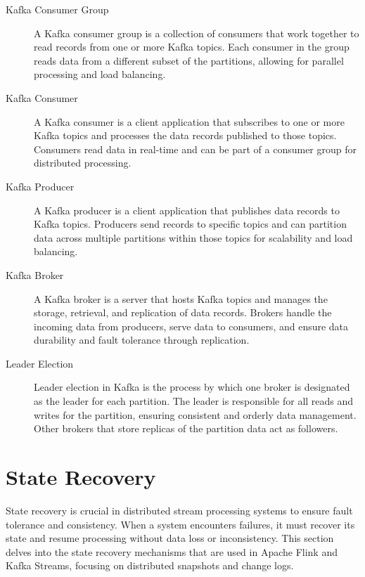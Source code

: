 \begin{description}
    \item[Kafka Consumer Group] A Kafka consumer group is a collection of consumers that work together to
    read records from one or more Kafka topics.
    Each consumer in the group reads data from a different subset of the partitions,
    allowing for parallel processing and load balancing.
    \item[Kafka Consumer] A Kafka consumer is a client application that subscribes to one
    or more Kafka topics and processes the data records published to those topics.
    Consumers read data in real-time and can be part of a
    consumer group for distributed processing.
    \item[Kafka Producer] A Kafka producer is a client application that publishes
    data records to Kafka topics. Producers send records to specific topics and can partition
    data across multiple partitions within those topics for scalability and load balancing.
    \item[Kafka Broker] A Kafka broker is a server that hosts Kafka topics and manages
    the storage, retrieval, and replication of data records.
    Brokers handle the incoming data from producers, serve data to consumers, and ensure data durability and fault tolerance through replication.
    \item[Leader Election] Leader election in Kafka is the process by
    which one broker is designated as the leader for each partition.
    The leader is responsible for all reads and writes for the partition,
    ensuring consistent and orderly data management.
    Other brokers that store replicas of the partition data act as followers.
\end{description}


\section{State Recovery}\label{subsec:state-recovery}
State recovery is crucial in distributed stream processing systems to ensure fault tolerance and consistency.
When a system encounters failures, it must recover its state and resume processing without data loss or inconsistency.
This section delves into the state recovery mechanisms that are used in Apache Flink and Kafka Streams,
focusing on distributed snapshots and change logs.

